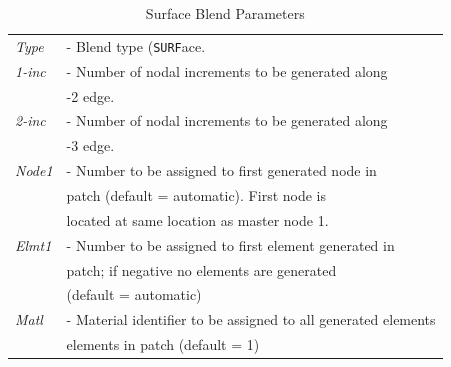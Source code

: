 \begin{table}[ht!]
\begin{center}
\begin{tabular}{l l}
\it Type  &- Blend type ({\tt SURF}ace. \\
\it 1-inc &- Number of nodal increments to be generated along \\
          &\quad 1-2 edge. \\
\it 2-inc & - Number of nodal increments to be generated along \\
          &\quad 2-3 edge. \\
\it Node1 &- Number to be assigned to first generated node in \\
          &\quad patch (default = automatic).  First node is \\
          &\quad located at same location as master node 1. \\
\it Elmt1 &- Number to be assigned to first element generated in \\
          &\quad patch; if negative no elements are generated \\
          & (default = automatic) \\
\it Matl &- Material identifier to be assigned to all generated elements \\
         &\quad elements in patch (default = 1) \\
\end{tabular}
\end{center}
\caption{Surface Blend Parameters}
\label{tabb1}
\end{table}
